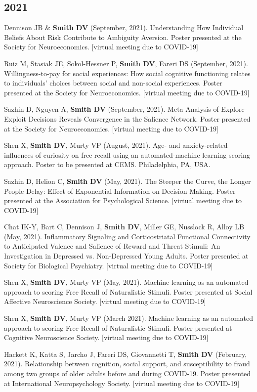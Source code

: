 \documentclass[11pt, letterpaper]{article}
\begin{document}
\subsection*{2021}
\begin{hangparas}{.5in}{1}

Dennison JB \& \textbf{Smith DV} (September, 2021). Understanding How Individual Beliefs About Risk Contribute to Ambiguity Aversion. Poster presented at the Society for Neuroeconomics. [virtual meeting due to COVID-19]

Ruiz M, Stasiak JE, Sokol-Hessner P, \textbf{Smith DV}, Fareri DS (September, 2021). Willingness-to-pay for social experiences: How social cognitive functioning relates to individuals' choices between social and non-social experiences. Poster presented at the Society for Neuroeconomics. [virtual meeting due to COVID-19]

Sazhin D, Nguyen A, \textbf{Smith DV} (September, 2021). Meta-Analysis of Explore-Exploit Decisions Reveals Convergence in the Salience Network. Poster presented at the Society for Neuroeconomics. [virtual meeting due to COVID-19]

Shen X, \textbf{Smith DV}, Murty VP (August, 2021). Age- and anxiety-related influences of curiosity on free recall using an automated-machine learning scoring approach. Poster to be presented at CEMS. Philadelphia, PA, USA.

Sazhin D, Helion C, \textbf{Smith DV} (May, 2021). The Steeper the Curve, the Longer People Delay: Effect of Exponential Information on Decision Making. Poster presented at the Association for Psychological Science. [virtual meeting due to COVID-19]

Chat IK-Y, Bart C, Dennison J, \textbf{Smith DV}, Miller GE, Nusslock R, Alloy LB (May, 2021). Inflammatory Signaling and Corticostriatal Functional Connectivity to Anticipated Valence and Salience of Reward and Threat Stimuli: An Investigation in Depressed vs. Non-Depressed Young Adults. Poster presented at Society for Biological Psychiatry. [virtual meeting due to COVID-19]

Shen X, \textbf{Smith DV}, Murty VP (May, 2021). Machine learning as an automated approach to scoring Free Recall of Naturalistic Stimuli. Poster presented at Social Affective Neuroscience Society. [virtual meeting due to COVID-19]

Shen X, \textbf{Smith DV}, Murty VP (March 2021). Machine learning as an automated approach to scoring Free Recall of Naturalistic Stimuli. Poster presented at Cognitive Neuroscience Society. [virtual meeting due to COVID-19]

Hackett K, Katta S, Jarcho J, Fareri DS, Giovannetti T, \textbf{Smith DV} (February, 2021). Relationship between cognition, social support, and susceptibility to fraud among two groups of older adults before and during COVID-19. Poster presented at International Neuropsychology Society. [virtual meeting due to COVID-19] \\

\end{hangparas}
\end{document}
